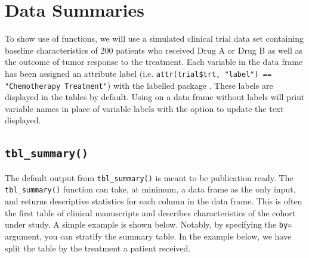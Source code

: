 \section{Data Summaries}

To show use of  functions, we will use a simulated clinical trial data set containing baseline characteristics of 200 patients who received Drug A or Drug B as well as the outcome of tumor response to the treatment.
Each variable in the data frame has been assigned an attribute label (i.e. \texttt{attr(trial\$trt, "label") == "Chemotherapy Treatment"}) with the labelled package \citep{labelled}. 
These labels are displayed in the  tables by default. Using  on a data frame without labels will print variable names in place of variable labels with the option to update the text displayed.



\subsection{\texorpdfstring{\texttt{tbl\_summary()}}{tbl\_summary()}}

The default output from \texttt{tbl\_summary()} is meant to be publication ready.
The \texttt{tbl\_summary()} function can take, at minimum, a data frame as the only input, and returns descriptive statistics for each column in the data frame.
This is often the first table of clinical manuscripts and describes characteristics of the cohort under study.
A simple example is shown below.
Notably, by specifying the \texttt{by=} argument, you can stratify the summary table. 
In the example below, we have split the table by the treatment a patient received. 

